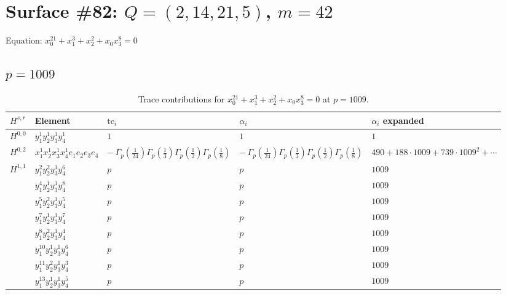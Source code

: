 \documentclass[11pt]{article}
\begin{document}
\newpage

\section*{Surface \#82: $Q=(2, 14, 21, 5)$, $m=42$}

Equation: $x_0^{21} + x_1^{3} + x_2^{2} + x_0 x_3^{8} = 0$

\subsection*{$p = 1009$}

\begin{table}[ht]
\centering
\caption{Trace contributions for $x_0^{21} + x_1^{3} + x_2^{2} + x_0 x_3^{8} = 0$ at $p=1009$.}\label{tab:deformed-82}
\renewcommand{\arraystretch}{1.1}
{\scriptsize
\begin{tabular}{@{}lllll@{}}
\toprule
$H^{s,r}$ & Element & $\mathrm{tc}_i$ & $\alpha_i$ & $\alpha_i$ expanded \\
\midrule
$H^{0,0}$ & $y_{1}^{1} y_{2}^{1} y_{3}^{1} y_{4}^{1}$ & $1$ & $1$ & $1$ \\
\midrule
$H^{0,2}$ & $x_{1}^{1} x_{2}^{1} x_{3}^{1} x_{4}^{1}  e_{1} e_{2} e_{3} e_{4}$ & $- \, \Gamma_p \left( \frac{1}{24} \right) \Gamma_p \left( \frac{1}{3} \right) \Gamma_p \left( \frac{1}{2} \right) \Gamma_p \left( \frac{1}{8} \right)$ & $- \, \Gamma_p \left( \frac{1}{24} \right) \Gamma_p \left( \frac{1}{3} \right) \Gamma_p \left( \frac{1}{2} \right) \Gamma_p \left( \frac{1}{8} \right)$ & $490{+}188{\cdot}1009{+}739{\cdot}1009^{2}{+}\cdots$ \\
\midrule
$H^{1,1}$ & $y_{1}^{2} y_{2}^{2} y_{3}^{1} y_{4}^{6}$ & $p \,$ & $p \,$ & $1009$ \\
 & $y_{1}^{4} y_{2}^{1} y_{3}^{1} y_{4}^{8}$ & $p \,$ & $p \,$ & $1009$ \\
 & $y_{1}^{5} y_{2}^{2} y_{3}^{1} y_{4}^{5}$ & $p \,$ & $p \,$ & $1009$ \\
 & $y_{1}^{7} y_{2}^{1} y_{3}^{1} y_{4}^{7}$ & $p \,$ & $p \,$ & $1009$ \\
 & $y_{1}^{8} y_{2}^{2} y_{3}^{1} y_{4}^{4}$ & $p \,$ & $p \,$ & $1009$ \\
 & $y_{1}^{10} y_{2}^{1} y_{3}^{1} y_{4}^{6}$ & $p \,$ & $p \,$ & $1009$ \\
 & $y_{1}^{11} y_{2}^{2} y_{3}^{1} y_{4}^{3}$ & $p \,$ & $p \,$ & $1009$ \\
 & $y_{1}^{13} y_{2}^{1} y_{3}^{1} y_{4}^{5}$ & $p \,$ & $p \,$ & $1009$ \\

\end{tabular}}
\end{table}
\end{document}
